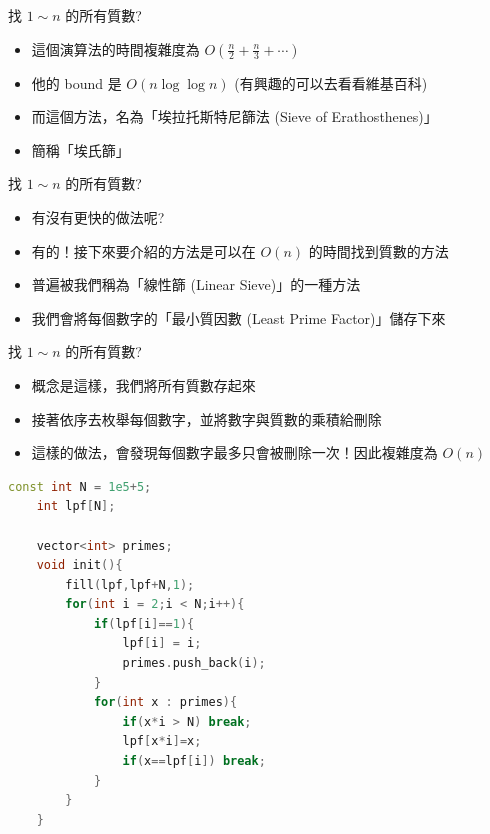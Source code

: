 \documentclass[aspectratio=169]{beamer}
\begin{document}
    \begin{frame}[fragile]{找 $1 \sim n$ 的所有質數?}
        \begin{itemize}
            \item 這個演算法的時間複雜度為 $O(\frac{n}{2}+\frac{n}{3} + \cdots)$
            \item 他的 bound 是 $O(n \log \log n)$ (有興趣的可以去看看維基百科)
            \item 而這個方法，名為「埃拉托斯特尼篩法 (Sieve of Erathosthenes)」
            \item 簡稱「埃氏篩」
        \end{itemize}
    \end{frame}
    
    \begin{frame}[fragile]{找 $1 \sim n$ 的所有質數?}
        \begin{itemize}
            \item 有沒有更快的做法呢?
            \item<2-> 有的！接下來要介紹的方法是可以在 $O(n)$ 的時間找到質數的方法
            \item<3-> 普遍被我們稱為「線性篩 (Linear Sieve)」的一種方法
            \item<4-> 我們會將每個數字的「最小質因數 (Least Prime Factor)」儲存下來
        \end{itemize}
    \end{frame}
    
    \begin{frame}[fragile]{找 $1 \sim n$ 的所有質數?}
        \begin{itemize}
            \item 概念是這樣，我們將所有質數存起來
            \item 接著依序去枚舉每個數字，並將數字與質數的乘積給刪除
            \item 這樣的做法，會發現每個數字最多只會被刪除一次！因此複雜度為 $O(n)$
        \end{itemize}
        \begin{lstlisting}[language=C++,basicstyle=\ttfamily\tiny]
    const int N = 1e5+5;
    int lpf[N];
     
    vector<int> primes;
    void init(){
        fill(lpf,lpf+N,1);
        for(int i = 2;i < N;i++){
            if(lpf[i]==1){
                lpf[i] = i;
                primes.push_back(i);
            }
            for(int x : primes){
                if(x*i > N) break;
                lpf[x*i]=x;
                if(x==lpf[i]) break;
            }
        }
    }
        \end{lstlisting}
    \end{frame}
    
\end{document}
